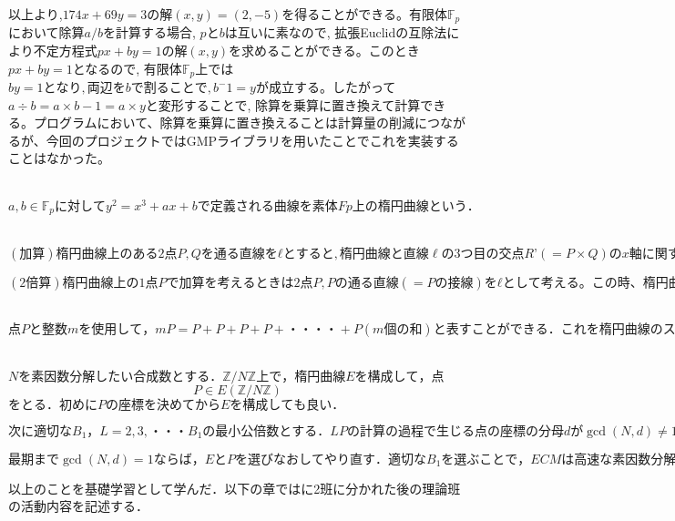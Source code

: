 \documentclass[openany,11pt,papersize]{jsbook}
\begin{document}
\begin{description}
以上より,$174x+69y=3の解(x,y)=(2,-5)$を得ることができる。有限体$\mathbb{F}_p$において除算$a/b$を計算する場合, $pとb$は互いに素なので, 拡張Euclidの互除法により不定方程式$px + by = 1 の解(x, y)$を求めることができる。このとき$px+ by= 1$となるので, 有限体$\mathbb{F}_p$上では$by = 1となり,両辺をbで割ることで,b^−1 = y$が成立する。したがって$a ÷ b = a×b-1=a × y$と変形することで, 除算を乗算に置き換えて計算できる。プログラムにおいて、除算を乗算に置き換えることは計算量の削減につながるが、今回のプロジェクトではGMPライブラリを用いたことでこれを実装することはなかった。


	
\item[楕円曲線の定義方程式]\mbox{}\\
	$a,b \in \mathbb{F}_pに対してy^2 = x^3 + ax + bで定義される曲線を素体Fp上の楕円曲線という．$

\item[楕円曲線の加算・2倍算]\mbox{}\\
	$(加算) 楕円曲線上のある2点P,Qを通る直線をℓとすると,楕円曲線と直線 \ell の3つ目の交点R’(=P×Q)のx軸に関する対称点をRとする。このとき2点P,Qの和をR=P+Qと定義し、楕円曲線の加算という。$
	
$(2倍算) 楕円曲線上の1点Pで加算を考えるときは2点P,Pの通る直線(=Pの接線)をℓとして考える。この時、楕円曲線と直線 \ell のP以外の交点のx軸に関する対称点をRとしたとき、R=P+P=2Pとできる。これが楕円曲線の2倍算である。
$
	
\item[楕円曲線のスカラー倍]\mbox{}\\
	$点Pと整数mを使用して，mP=P+P+P+P+・・・・+P(m個の和)と表すことができる．これを楕円曲線のスカラー倍という．$

\item[楕円曲線法のアルゴリズム ]\mbox{}\\
	$Nを素因数分解したい合成数とする．\mathbb{Z}/N\mathbb{Z}上で，楕円曲線Eを構成して，点$
	\begin{equation}
	P \in E(\mathbb{Z}/N\mathbb{Z})
	\end{equation}
	$をとる．初めにPの座標を決めてからEを構成しても良い．$
	
	$次に適切なB_1，L=2,3,・・・B_1の最小公倍数とする．LPの計算の過程で生じる点の座標の分母dが\gcd(N,d) \neq 1となるとNの約数を発見できる．$
	
	$最期まで\gcd (N,d)=1ならば，EとPを選びなおしてやり直す．適切なB_1を選ぶことで，ECMは高速な素因数分解法になることが知られている．$
\end{description}
以上のことを基礎学習として学んだ．以下の章ではに2班に分かれた後の理論班の活動内容を記述する．
\end{document}
